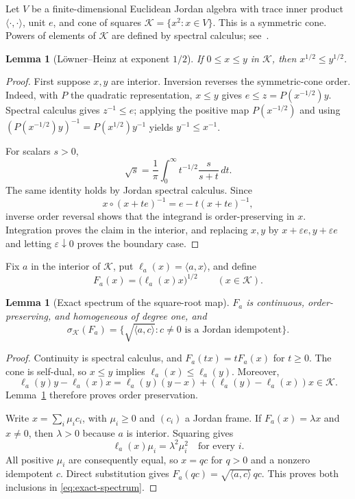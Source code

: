\documentclass[10pt]{article}
\newtheorem{lemma}[theorem]{Lemma}
\newcommand{\K}{\mathcal K}
\begin{document}
Let $V$ be a finite-dimensional Euclidean Jordan algebra with trace inner
product $\langle\cdot,\cdot\rangle$, unit $e$, and cone of squares
$\K=\{x^2:x\in V\}$.  This is a symmetric cone.  Powers of elements of $\K$
are defined by spectral calculus; see~\cite{Gowda,FK}.

\begin{lemma}[L\"owner--Heinz at exponent $1/2$]\label{lem:sqrt}
If $0\leq x\leq y$ in $\K$, then $x^{1/2}\leq y^{1/2}$.
\end{lemma}

\begin{proof}
First suppose $x,y$ are interior.  Inversion reverses the symmetric-cone
order.  Indeed, with $P$ the quadratic representation, $x\leq y$ gives
$e\leq z=P(x^{-1/2})y$.  Spectral calculus gives $z^{-1}\leq e$; applying
the positive map $P(x^{-1/2})$ and using
$(P(x^{-1/2})y)^{-1}=P(x^{1/2})y^{-1}$ yields $y^{-1}\leq x^{-1}$.

For scalars $s>0$,
\[
 \sqrt{s}=\frac1\pi\int_0^\infty t^{-1/2}\frac{s}{s+t}\,dt.
\]
The same identity holds by Jordan spectral calculus.  Since
\[
 x\circ(x+te)^{-1}=e-t(x+te)^{-1},
\]
inverse order reversal shows that the integrand is order-preserving in $x$.
Integration proves the claim in the interior, and replacing $x,y$ by
$x+\varepsilon e,y+\varepsilon e$ and letting $\varepsilon\downarrow0$
proves the boundary case.
\end{proof}

Fix $a$ in the interior of $\K$, put $\ell_a(x)=\langle a,x\rangle$, and
define
\begin{equation}\label{eq:map}
 F_a(x)=\bigl(\ell_a(x)x\bigr)^{1/2}\qquad(x\in\K).
\end{equation}

\begin{lemma}[Exact spectrum of the square-root map]\label{lem:spectrum}
$F_a$ is continuous, order-preserving, and homogeneous of degree one, and
\begin{equation}\label{eq:exact-spectrum}
 \sigma_{\K}(F_a)
 =\{\sqrt{\langle a,c\rangle}:c\ne0\text{ is a Jordan idempotent}\}.
\end{equation}
\end{lemma}

\begin{proof}
Continuity is spectral calculus, and $F_a(tx)=tF_a(x)$ for $t\geq0$.  The
cone is self-dual, so $x\leq y$ implies $\ell_a(x)\leq\ell_a(y)$.  Moreover,
\[
 \ell_a(y)y-\ell_a(x)x
 =\ell_a(y)(y-x)+(\ell_a(y)-\ell_a(x))x\in\K.
\]
Lemma~\ref{lem:sqrt} therefore proves order preservation.

Write $x=\sum_i\mu_i c_i$, with $\mu_i\geq0$ and $(c_i)$ a Jordan frame.
If $F_a(x)=\lambda x$ and $x\ne0$, then $\lambda>0$ because $a$ is interior.
Squaring gives
\[
 \ell_a(x)\mu_i=\lambda^2\mu_i^2\quad\text{for every }i.
\]
All positive $\mu_i$ are consequently equal, so $x=q c$ for $q>0$ and a
nonzero idempotent $c$.  Direct substitution gives
$F_a(qc)=\sqrt{\langle a,c\rangle}\,qc$.  This proves both inclusions in
\eqref{eq:exact-spectrum}.
\end{proof}
\end{document}
